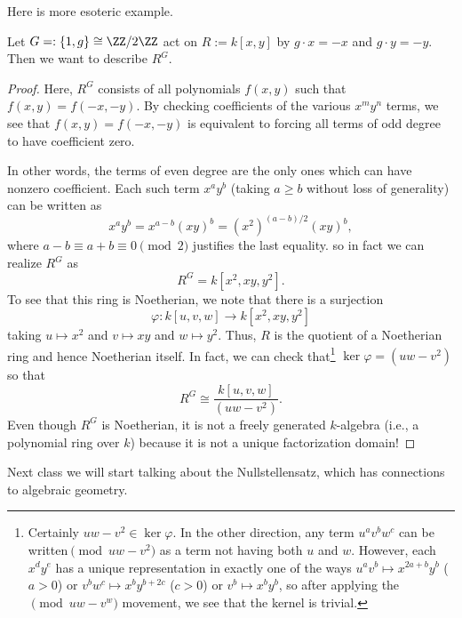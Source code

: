 Here is more esoteric example.
\begin{exe}
	Let $G=:\{1,g\}\cong\ZZ/2\ZZ$ act on $R:=k[x,y]$ by $g\cdot x=-x$ and $g\cdot y=-y$. Then we want to describe $R^G$.
\end{exe}
\begin{proof}
	Here, $R^G$ consists of all polynomials $f(x,y)$ such that $f(x,y)=f(-x,-y)$. By checking coefficients of the various $x^my^n$ terms, we see that $f(x,y)=f(-x,-y)$ is equivalent to forcing all terms of odd degree to have coefficient zero.
	
	In other words, the terms of even degree are the only ones which can have nonzero coefficient. Each such term $x^ay^b$ (taking $a\ge b$ without loss of generality) can be written as
	\[x^ay^b=x^{a-b}(xy)^b=\left(x^2\right)^{(a-b)/2}(xy)^b,\]
	where $a-b\equiv a+b\equiv0\pmod2$ justifies the last equality. so in fact we can realize $R^G$ as
	\[R^G=k\left[x^2,xy,y^2\right].\]
	To see that this ring is Noetherian, we note that there is a surjection
	\[\varphi:k[u,v,w]\to k\left[x^2,xy,y^2\right]\]
	taking $u\mapsto x^2$ and $v\mapsto xy$ and $w\mapsto y^2$. Thus, $R$ is the quotient of a Noetherian ring and hence Noetherian itself. In fact, we can check that\footnote{Certainly $uw-v^2\in\ker\varphi$. In the other direction, any term $u^av^bw^c$ can be written$\pmod{uw-v^2}$ as a term not having both $u$ and $w$. However, each $x^dy^e$ has a unique representation in exactly one of the ways $u^av^b\mapsto x^{2a+b}y^b$ ($a>0$) or $v^bw^c\mapsto x^by^{b+2c}$ ($c>0$) or $v^b\mapsto x^by^b$, so after applying the$\pmod{uw-v^w}$ movement, we see that the kernel is trivial.} $\ker\varphi=\left(uw-v^2\right)$ so that
	\[R^G\cong\frac{k[u,v,w]}{\left(uw-v^2\right)}.\]
	Even though $R^G$ is Noetherian, it is not a freely generated $k$-algebra (i.e., a polynomial ring over $k$) because it is not a unique factorization domain!
\end{proof}
Next class we will start talking about the Nullstellensatz, which has connections to algebraic geometry.